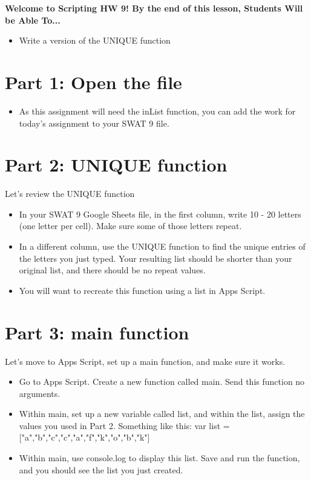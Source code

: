\documentclass{article}
\newcommand{\AName}{Scripting HW 9}
\begin{document}
\textbf{Welcome to \AName!  By the end of this lesson, Students Will be Able To...}
\begin{itemize}
    \item Write a version of the UNIQUE function
\end{itemize}


\section*{Part 1: Open the file}
\begin{itemize}
    \item As this assignment will need the inList function, you can add the work for today's assignment to your SWAT 9 file.
\end{itemize}

\section*{Part 2: UNIQUE function}
Let's review the UNIQUE function
\begin{itemize}
    \item In your SWAT 9 Google Sheets file, in the first column, write 10 - 20 letters (one letter per cell).  Make sure some of those letters repeat.
    \item In a different column, use the UNIQUE function to find the unique entries of the letters you just typed.  Your resulting list should be shorter than your original list, and there should be no repeat values.
    \item You will want to recreate this function using a list in Apps Script.
\end{itemize}

\section*{Part 3: main function}
Let's move to Apps Script, set up a main function, and make sure it works.
\begin{itemize}
    \item Go to Apps Script.  Create a new function called main.  Send this function no arguments.
    \item Within main, set up a new variable called list, and within the list, assign the values you used in Part 2.  Something like this:  var list = ["a","b","c","c","a","f","k","o","b","k"]
    \item Within main, use console.log to display this list.  Save and run the function, and you should see the list you just created.
\end{itemize}
\end{document}
